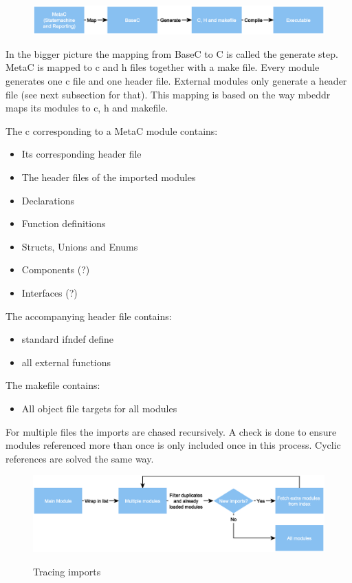 \documentclass[a4paper,10pt,titlepage]{report}
\begin{document}
\begin{figure}[ht!]
\centering
\includegraphics[width=\linewidth]{pics/compilation_simple.eps}
\label{fig:compilation_simple}
\caption{}
\end{figure}

In the bigger picture the mapping from BaseC to C is called the generate step. MetaC is mapped to c and h files together with a make file. Every module generates one c file and one header file. External modules only generate a header file (see next subsection for that). This mapping is based on the way mbeddr maps its modules to c, h and makefile.

The c corresponding to a MetaC module contains:
\begin{itemize}
\item Its corresponding header file
\item The header files of the imported modules
\item Declarations
\item Function definitions
\item Structs, Unions and Enums
\item Components (?)
\item Interfaces (?)
\end{itemize}

The accompanying header file contains:
\begin{itemize}
\item standard ifndef define
\item all external functions
\end{itemize}

The makefile contains:
\begin{itemize}
\item All object file targets for all modules
\end{itemize}
For multiple files the imports are chased recursively. A check is done to ensure modules referenced more than once is only included once in this process. Cyclic references are solved the same way.

\begin{figure}
\centering
\includegraphics[width=\linewidth]{pics/tracing_imports.eps}
\label{fig:trace_imports}
\caption{Tracing imports}
\end{figure}
\end{document}
